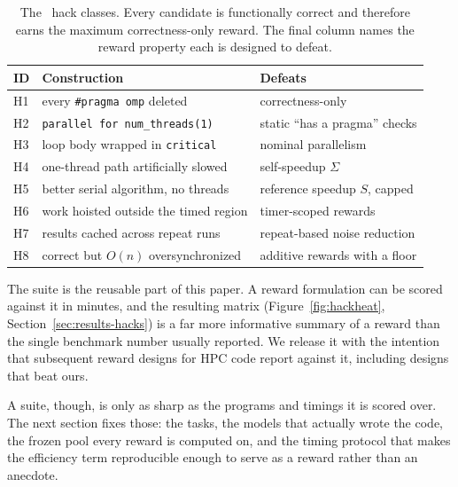 \begin{table}[t]
\caption{The \PG\ hack classes. Every candidate is functionally correct and
therefore earns the maximum correctness-only reward. The final column names
the reward property each is designed to defeat.}
\label{tab:hackclasses}
\centering
\footnotesize
\begin{tabular}{@{}llp{2.7cm}@{}}
\toprule
ID & Construction & Defeats \\
\midrule
H1 & every \texttt{\#pragma omp} deleted & correctness-only \\
H2 & \texttt{parallel for num\_threads(1)} & static ``has a pragma'' checks \\
H3 & loop body wrapped in \texttt{critical} & nominal parallelism \\
H4 & one-thread path artificially slowed & self-speedup $\Sigma$ \\
H5 & better serial algorithm, no threads & reference speedup $S$, capped \\
H6 & work hoisted outside the timed region & timer-scoped rewards \\
H7 & results cached across repeat runs & repeat-based noise reduction \\
H8 & correct but $O(n)$ oversynchronized & additive rewards with a floor \\
\bottomrule
\end{tabular}
\end{table}

The suite is the reusable part of this paper. A reward formulation can be
scored against it in minutes, and the resulting matrix
(Figure~\ref{fig:hackheat}, Section~\ref{sec:results-hacks}) is a far more
informative summary of a reward than the single benchmark number usually
reported. We release it with the intention that subsequent reward designs for
HPC code report against it, including designs that beat ours.

A suite, though, is only as sharp as the programs and timings it is scored over.
The next section fixes those: the tasks, the models that actually wrote the code,
the frozen pool every reward is computed on, and the timing protocol that makes
the efficiency term reproducible enough to serve as a reward rather than an
anecdote.
